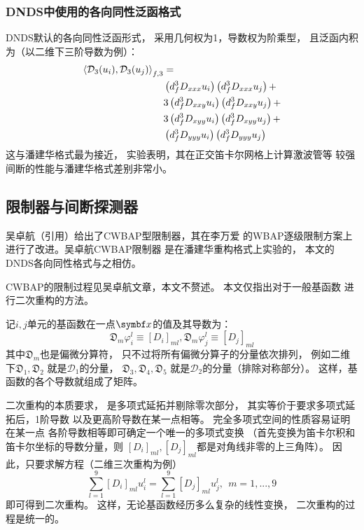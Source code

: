 \documentclass[UTF8,zihao=5]{ctexart} %
\begin{document}
\subsubsection{DNDS中使用的各向同性泛函格式}

DNDS默认的各向同性泛函形式，
采用几何权为1，导数权为阶乘型，
且泛函内积为（以二维下三阶导数为例）：
$$
    \begin{aligned}
        \left\langle\mathcal{D}_3(u_i),\mathcal{D}_3(u_j)\right\rangle_{f,3}
         & = \\
         &
        \left(d_f^3 D_{xxx}u_i\right)
        \left(d_f^3 D_{xxx}u_j\right)
        +    \\
         &
        3
        \left(d_f^3 D_{xxy}u_i\right)
        \left(d_f^3 D_{xxy}u_j\right)
        +    \\
         &
        3
        \left(d_f^3 D_{xyy}u_i\right)
        \left(d_f^3 D_{xyy}u_j\right)
        +    \\
         &
        \left(d_f^3 D_{yyy}u_i\right)
        \left(d_f^3 D_{yyy}u_j\right)
    \end{aligned}
$$
这与潘建华格式最为接近，
实验表明，其在正交笛卡尔网格上计算激波管等
较强间断的性能与潘建华格式差别非常小。

\subsection{限制器与间断探测器}

吴卓航（引用）给出了CWBAP型限制器，其在李万爱\cite{li2011multi,li2012multi}
的WBAP逐级限制方案上进行了改进。吴卓航CWBAP限制器
是在潘建华重构格式上实验的，
本文的DNDS各向同性格式与之相仿。

CWBAP的限制过程见吴卓航文章，本文不赘述。
本文仅指出对于一般基函数
进行二次重构的方法。

记$i,j$单元的基函数在一点$\x$的值及其导数为：
$$
\mathfrak{D}_m{\varphi_i^l}\equiv [D_i]_{ml}
, \mathfrak{D}_m{\varphi_j^l}\equiv [D_j]_{ml}
$$
其中$\mathfrak{D}_m$也是偏微分算符，
只不过将所有偏微分算子的分量依次排列，
例如二维下$\mathfrak{D}_1,\mathfrak{D}_2$
就是$\mathcal{D}_1$的分量，
$\mathfrak{D}_3,\mathfrak{D}_4,\mathfrak{D}_5$
就是$\mathcal{D}_2$的分量（排除对称部分）。
这样，基函数的各个导数就组成了矩阵。

二次重构的本质要求，
是多项式延拓并剔除零次部分，
其实等价于要求多项式延拓后，1阶导数
以及更高阶导数在某一点相等。
完全多项式空间的性质容易证明在某一点
各阶导数相等即可确定一个唯一的多项式变换
（首先变换为笛卡尔积和笛卡尔坐标的导数分量，则
$[D_i]_{ml},[D_j]_{ml}$都是对角线非零的上三角阵）。
因此，只要求解方程（二维三次重构为例）
$$
\sum_{l=1}^{9}[D_i]_{ml}u_i^l = 
\sum_{l=1}^{9}[D_j]_{ml}u_j^l, \ \ m=1,...,9
$$
即可得到二次重构。
这样，无论基函数经历多么复杂的线性变换，
二次重构的过程是统一的。
\end{document}
